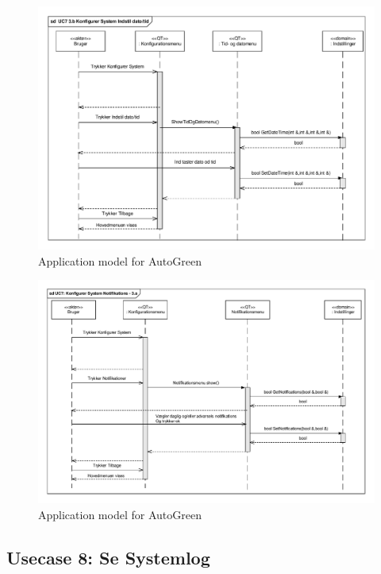 \begin{figure}[!h]
\centering 
\includegraphics[width={\textwidth-1cm}, trim=0 0 0 0, clip=true] {../fig/SD_autoGreen_UC_7_Indstil_dato_tid.pdf}
\caption{Application model for AutoGreen}
\label{fig:SD_UC7_alt2}
\end{figure}

\clearpage

\begin{figure}[!h]
\centering 
\includegraphics[width={\textwidth-1cm}, trim=0 0 0 0, clip=true] {../fig/SD_autoGreen_UC_7_Notifikationer.pdf}
\caption{Application model for AutoGreen}
\label{fig:SD_UC7_alt3}
\end{figure}

\clearpage

\subsection{Usecase 8: Se Systemlog}

